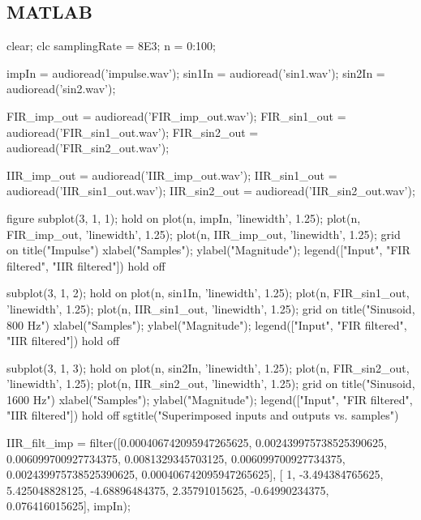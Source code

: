 \documentclass{bannerReport}
\begin{document}
	\subsection{MATLAB}
		\begin{code}
clear; clc
samplingRate = 8E3;
n = 0:100;



impIn = audioread('impulse.wav');
sin1In = audioread('sin1.wav');
sin2In = audioread('sin2.wav');

FIR_imp_out = audioread('FIR_imp_out.wav');
FIR_sin1_out = audioread('FIR_sin1_out.wav');
FIR_sin2_out = audioread('FIR_sin2_out.wav');

IIR_imp_out = audioread('IIR_imp_out.wav');
IIR_sin1_out = audioread('IIR_sin1_out.wav');
IIR_sin2_out = audioread('IIR_sin2_out.wav');



figure
subplot(3, 1, 1);
hold on
	plot(n, impIn, 'linewidth', 1.25);
	plot(n, FIR_imp_out, 'linewidth', 1.25);
	plot(n, IIR_imp_out, 'linewidth', 1.25);
	grid on
	title("Impulse")
	xlabel("Samples");
	ylabel("Magnitude");
	legend(["Input", "FIR filtered", "IIR filtered"])
hold off

subplot(3, 1, 2);
hold on
	plot(n, sin1In, 'linewidth', 1.25);
	plot(n, FIR_sin1_out, 'linewidth', 1.25);
	plot(n, IIR_sin1_out, 'linewidth', 1.25);
	grid on
	title("Sinusoid, 800 Hz")
	xlabel("Samples");
	ylabel("Magnitude");
	legend(["Input", "FIR filtered", "IIR filtered"])
hold off

subplot(3, 1, 3);
hold on
	plot(n, sin2In, 'linewidth', 1.25);
	plot(n, FIR_sin2_out, 'linewidth', 1.25);
	plot(n, IIR_sin2_out, 'linewidth', 1.25);
	grid on
	title("Sinusoid, 1600 Hz")
	xlabel("Samples");
	ylabel("Magnitude");
	legend(["Input", "FIR filtered", "IIR filtered"])
hold off
sgtitle("Superimposed inputs and outputs vs. samples")


IIR_filt_imp = filter([0.000406742095947265625, 0.002439975738525390625,
 0.006099700927734375, 0.0081329345703125, 0.006099700927734375,
  0.002439975738525390625, 0.000406742095947265625], [ 1, -3.494384765625,
   5.425048828125, -4.68896484375, 2.35791015625,
    -0.64990234375, 0.076416015625], impIn);


\end{code}
\end{document}

